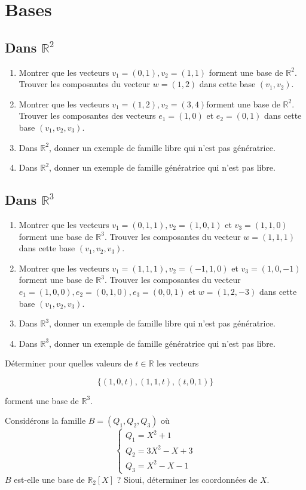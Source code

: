 \section*{Bases}
\vspace{2em}

\subsection{Dans $\mathbb{R}^2$}
\begin{enumerate}
\item  Montrer que les vecteurs $v_1=(0,1), v_2=(1,1)$ forment une base de $\mathbb{R}^2$. Trouver les composantes du vecteur $w=(1,2)$ dans cette base $\left(v_1, v_2\right)$.
\item Montrer que les vecteurs $v_1=(1,2), v_2=(3,4)$forment une base de $\mathbb{R}^2$. Trouver les composantes des vecteurs $e_1=(1,0)$ et $e_2=(0,1)$ dans cette base $\left(v_1, v_2, v_3\right)$.
\item Dans $\mathbb{R}^2$, donner un exemple de famille libre qui n'est pas génératrice.
\item Dans $\mathbb{R}^2$, donner un exemple de famille génératrice qui n'est pas libre.
\end{enumerate}

\vspace{2em}

\subsection{Dans $\mathbb{R}^3$}
\begin{enumerate}
\item  Montrer que les vecteurs $v_1=(0,1,1), v_2=(1,0,1)$ et $v_3=(1,1,0)$ forment une base de $\mathbb{R}^3$. Trouver les composantes du vecteur $w=(1,1,1)$ dans cette base $\left(v_1, v_2, v_3\right)$.
\item Montrer que les vecteurs $v_1=(1,1,1), v_2=(-1,1,0)$ et $v_3=(1,0,-1)$ forment une base de $\mathbb{R}^3$. Trouver les composantes du vecteur $e_1=(1,0,0), e_2=(0,1,0), e_3=(0,0,1)$ et $w=(1,2,-3)$ dans cette base $\left(v_1, v_2, v_3\right)$.
\item Dans $\mathbb{R}^3$, donner un exemple de famille libre qui n'est pas génératrice.
\item Dans $\mathbb{R}^3$, donner un exemple de famille génératrice qui n'est pas libre.
\end{enumerate}


Déterminer pour quelles valeurs de $t \in \mathbb{R}$ les vecteurs

$$
\{(1,0, t),(1,1, t),(t, 0,1)\}
$$

forment une base de $\mathbb{R}^3$.

\vspace{2em}
Considérons la famille $B=\left(Q_1, Q_2, Q_3\right)$ où $$\left\{\begin{array}{l}Q_1=X^2+1 \\ Q_2=3 X^2-X+3 \\ Q_3=X^2-X-1\end{array}\right.$$
$B$ est-elle une base de $\mathbb{R}_2[X]$ ? Sioui, déterminer les coordonnées de $X$.
  
